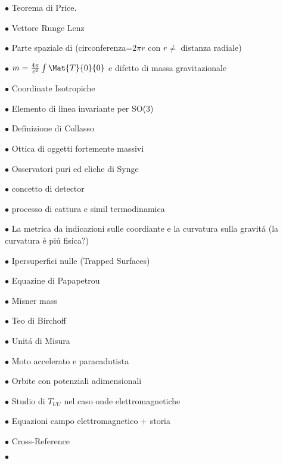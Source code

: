 
\item{$\bullet$} Teorema di Price.
\item{$\bullet$} Vettore Runge Lenz
\item{$\bullet$} Parte spaziale di \Sch (circonferenza=$2\pi r$ con $r\neq$ distanza radiale)
\item{$\bullet$} $m={4\pi\over c^2}\int\Mat{T}{0}{0}$ e difetto di massa gravitazionale
\item{$\bullet$} Coordinate Isotropiche
\item{$\bullet$} Elemento di linea invariante per SO(3)
\item{$\bullet$} Definizione di Collasso
\item{$\bullet$} Ottica di oggetti fortemente massivi
\item{$\bullet$} Osservatori puri ed eliche di Synge
\item{$\bullet$} concetto di detector
\item{$\bullet$} processo di cattura e simil termodinamica
\item{$\bullet$} La metrica da indicazioni sulle coordiante e la curvatura sulla gravit\'a (la curvatura \'e pi\'u fisica?)
\item{$\bullet$} Ipersuperfici nulle (Trapped Surfaces)
\item{$\bullet$} Equazine di Papapetrou
\item{$\bullet$} Misner mass
\item{$\bullet$} Teo di Birchoff
\item{$\bullet$} Unit\'a di Misura
\item{$\bullet$} Moto accelerato e paracadutista
\item{$\bullet$} Orbite con potenziali adimensionali
\item{$\bullet$} Studio di $T_{UU}$ nel caso onde elettromagnetiche
\item{$\bullet$} Equazioni campo elettromagnetico + storia
\item{$\bullet$} Cross-Reference
\item{$\bullet$}